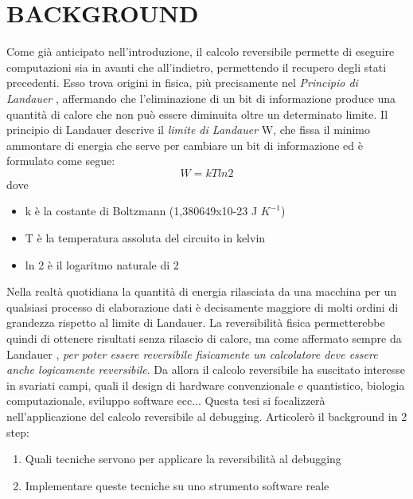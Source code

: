 \documentclass[Tesi.tex]{subfiles}
\begin{document}
\section{BACKGROUND}
Come già anticipato nell'introduzione, il calcolo reversibile permette di eseguire computazioni sia in avanti che all'indietro, permettendo il recupero degli stati precedenti.
Esso trova origini in fisica, più precisamente nel \textit{Principio di Landauer} \cite{landauer}, affermando che l'eliminazione di un bit di informazione produce una quantità di calore che non può essere diminuita oltre un determinato limite.
Il principio di Landauer descrive il \textit{limite di Landauer} W, che fissa il minimo ammontare di energia che serve per cambiare un bit di informazione ed è formulato come segue: 
\[
W=kT ln 2
\]
dove
\begin{itemize}
	\item k è la costante di Boltzmann (1,380649x10-23 J $K^{-1}$)
	\item T è la temperatura assoluta del circuito in kelvin
	\item ln 2 è il logaritmo naturale di 2
\end{itemize}
Nella realtà quotidiana la quantità di energia rilasciata da una macchina per un qualsiasi processo di elaborazione dati è decisamente maggiore di molti ordini di grandezza rispetto al limite di Landauer.
La reversibilità fisica permetterebbe quindi di ottenere risultati senza rilascio di calore, ma come affermato sempre da Landauer \cite{wikipedia}, \textit{per poter essere reversibile fisicamente un calcolatore deve essere anche logicamente reversibile}.
Da allora il calcolo reversibile ha suscitato interesse in svariati campi, quali il design di hardware convenzionale e quantistico, biologia computazionale, sviluppo software ecc..\cite{book}.
Questa tesi si focalizzerà nell'applicazione del calcolo reversibile al debugging.
Articolerò il background in 2 step:
\begin{enumerate}
	\item Quali tecniche servono per applicare la reversibilità al debugging
	\item Implementare queste tecniche su uno strumento software reale
\end{enumerate}


\end{document}
